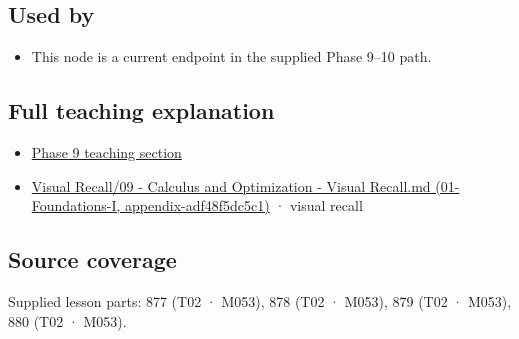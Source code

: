 \subsection{Used by}\label{used-by}

\begin{itemize}
\tightlist
\item
  This node is a current endpoint in the supplied Phase 9--10 path.
\end{itemize}

\subsection{Full teaching explanation}\label{full-teaching-explanation}

\begin{itemize}
\tightlist
\item
  \href{Continuous\%20Notes/Computing\%20Foundations\%20-\%20From\%20Bits\%20to\%20C++\%20and\%20Systems\%20APIs\#Optimization\%20and\%20inverse\%20problems}{Phase 9 teaching section}
\item
  \href{}{Visual Recall/09 - Calculus and Optimization - Visual Recall.md (01-Foundations-I, appendix-adf48f5dc5c1)} · visual recall
\end{itemize}

\subsection{Source coverage}\label{source-coverage}

Supplied lesson parts: 877 (T02 · M053), 878 (T02 · M053), 879 (T02 · M053), 880 (T02 · M053).
